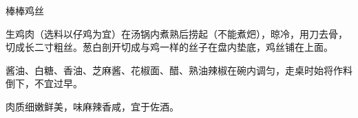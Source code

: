 \begin{recipe}{棒棒鸡丝}

\ingredients


\preparation

\step 生鸡肉（选料以仔鸡为宜）在汤锅内煮熟后捞起（不能煮𤆵），晾冷，用刀去骨，
切成长二寸粗丝。葱白剖开切成与鸡一样的丝子在盘内垫底，鸡丝铺在上面。

\step 酱油、白糖、香油、芝麻酱、花椒面、醋、熟油辣椒在碗内调匀，走桌时始将作料
倒下，不宜过早。

\features

肉质细嫩鲜美，味麻辣香咸，宜于佐酒。

\end{recipe}

